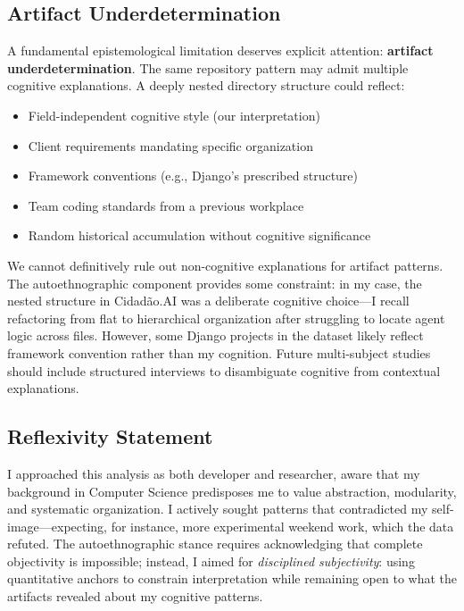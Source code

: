 \documentclass{ntlabs-preprint}
\begin{document}
\subsection{Artifact Underdetermination}

A fundamental epistemological limitation deserves explicit attention: \textbf{artifact underdetermination}. The same repository pattern may admit multiple cognitive explanations. A deeply nested directory structure could reflect:

\begin{itemize}
    \item Field-independent cognitive style (our interpretation)
    \item Client requirements mandating specific organization
    \item Framework conventions (e.g., Django's prescribed structure)
    \item Team coding standards from a previous workplace
    \item Random historical accumulation without cognitive significance
\end{itemize}

We cannot definitively rule out non-cognitive explanations for artifact patterns. The autoethnographic component provides some constraint: in my case, the nested structure in Cidadão.AI was a deliberate cognitive choice---I recall refactoring from flat to hierarchical organization after struggling to locate agent logic across files. However, some Django projects in the dataset likely reflect framework convention rather than my cognition. Future multi-subject studies should include structured interviews to disambiguate cognitive from contextual explanations.

\subsection{Reflexivity Statement}

I approached this analysis as both developer and researcher, aware that my background in Computer Science predisposes me to value abstraction, modularity, and systematic organization. I actively sought patterns that contradicted my self-image---expecting, for instance, more experimental weekend work, which the data refuted. The autoethnographic stance requires acknowledging that complete objectivity is impossible; instead, I aimed for \textit{disciplined subjectivity}: using quantitative anchors to constrain interpretation while remaining open to what the artifacts revealed about my cognitive patterns.
\end{document}
